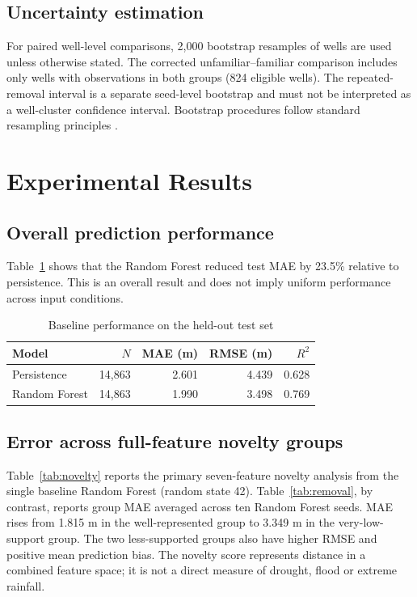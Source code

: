 \documentclass[conference]{IEEEtran}
\begin{document}
\subsection{Uncertainty estimation}
For paired well-level comparisons, 2,000 bootstrap resamples of wells are used unless otherwise stated. The corrected unfamiliar--familiar comparison includes only wells with observations in both groups (824 eligible wells). The repeated-removal interval is a separate seed-level bootstrap and must not be interpreted as a well-cluster confidence interval. Bootstrap procedures follow standard resampling principles \cite{efron}.

\section{Experimental Results}
\subsection{Overall prediction performance}
Table~\ref{tab:baseline} shows that the Random Forest reduced test MAE by 23.5\% relative to persistence. This is an overall result and does not imply uniform performance across input conditions.

\begin{table}[t]
\caption{Baseline performance on the held-out test set}
\label{tab:baseline}
\centering
\footnotesize
\begin{tabular}{lrrrr}
\toprule
Model & $N$ & MAE (m) & RMSE (m) & $R^2$\\
\midrule
Persistence & 14,863 & 2.601 & 4.439 & 0.628\\
Random Forest & 14,863 & 1.990 & 3.498 & 0.769\\
\bottomrule
\end{tabular}
\end{table}

\subsection{Error across full-feature novelty groups}
Table~\ref{tab:novelty} reports the primary seven-feature novelty analysis from the single baseline Random Forest (random state 42). Table~\ref{tab:removal}, by contrast, reports group MAE averaged across ten Random Forest seeds. MAE rises from 1.815 m in the well-represented group to 3.349 m in the very-low-support group. The two less-supported groups also have higher RMSE and positive mean prediction bias. The novelty score represents distance in a combined feature space; it is not a direct measure of drought, flood or extreme rainfall.
\end{document}
